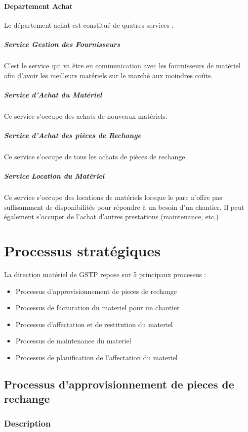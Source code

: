             \paragraph{Departement Achat}
                Le département achat est constitué de quatres services :

                \subparagraph{Service Gestion des Fournisseurs}
	                C'est le service qui va être en communication avec les fournisseurs de matériel afin d'avoir les meilleurs matériels sur le marché aux moindres coûts.
                \subparagraph{Service d'Achat du Matériel}
	                Ce service s'occupe des achats de nouveaux matériels.
                \subparagraph{Service d'Achat des pièces de Rechange}
	                Ce service s'occupe de tous les achats de pièces de rechange.
                \subparagraph{Service Location du Matériel}
	                Ce service s'occupe des locations de matériels lorsque le parc n'offre pas suffisamment de disponibilités pour répondre à un besoin d'un chantier. Il peut également s'occuper de l'achat d'autres prestations (maintenance, etc.)


\section{Processus stratégiques}
		La direction matériel de GSTP repose sur 5 principaux processus :
		\begin{itemize}
				\item Processus d'approvisionnement de pieces de rechange
				\item Processus de facturation du materiel pour un chantier
				\item Processus d'affectation et de restitution du materiel
				\item Processus de maintenance du materiel
				\item Processus de planification de l'affectation du materiel
    \end{itemize}


		\subsection{Processus d'approvisionnement de pieces de rechange}
				\subsubsection{Description}
				
